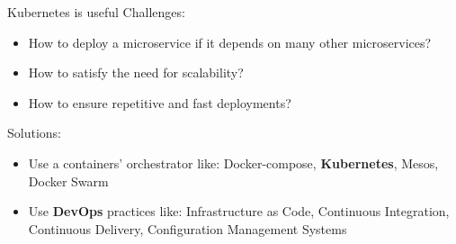 \documentclass{beamer}
\begin{document}



\begin{frame}{Kubernetes is useful}%
Challenges:
\begin{itemize}
	\item How to deploy a microservice if it depends on many other microservices?
	\item How to satisfy the need for scalability?
	\item How to ensure repetitive and fast deployments?
\end{itemize}

Solutions:
\begin{itemize}
	\item Use a containers' orchestrator like: Docker-compose, \textbf{Kubernetes}, Mesos, Docker Swarm
	\item Use \textbf{DevOps} practices like: Infrastructure as Code, Continuous Integration, Continuous Delivery, Configuration Management Systems
\end{itemize}
\end{frame}
\end{document}
